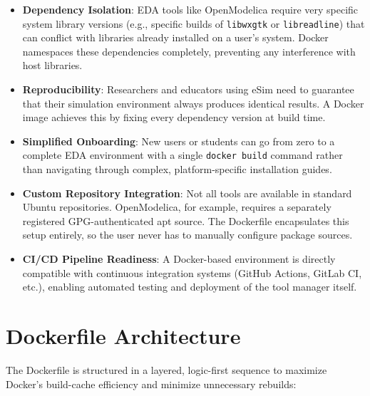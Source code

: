\documentclass[12pt,a4paper]{report}
\begin{document}
\begin{itemize}
    \item \textbf{Dependency Isolation}: EDA tools like OpenModelica require very specific system library versions (e.g., specific builds of \texttt{libwxgtk} or \texttt{libreadline}) that can conflict with libraries already installed on a user's system. Docker namespaces these dependencies completely, preventing any interference with host libraries.
    \item \textbf{Reproducibility}: Researchers and educators using eSim need to guarantee that their simulation environment always produces identical results. A Docker image achieves this by fixing every dependency version at build time.
    \item \textbf{Simplified Onboarding}: New users or students can go from zero to a complete EDA environment with a single \texttt{docker build} command rather than navigating through complex, platform-specific installation guides.
    \item \textbf{Custom Repository Integration}: Not all tools are available in standard Ubuntu repositories. OpenModelica, for example, requires a separately registered GPG-authenticated apt source. The Dockerfile encapsulates this setup entirely, so the user never has to manually configure package sources.
    \item \textbf{CI/CD Pipeline Readiness}: A Docker-based environment is directly compatible with continuous integration systems (GitHub Actions, GitLab CI, etc.), enabling automated testing and deployment of the tool manager itself.
\end{itemize}

\section{Dockerfile Architecture}
The Dockerfile is structured in a layered, logic-first sequence to maximize Docker's build-cache efficiency and minimize unnecessary rebuilds:
\end{document}

